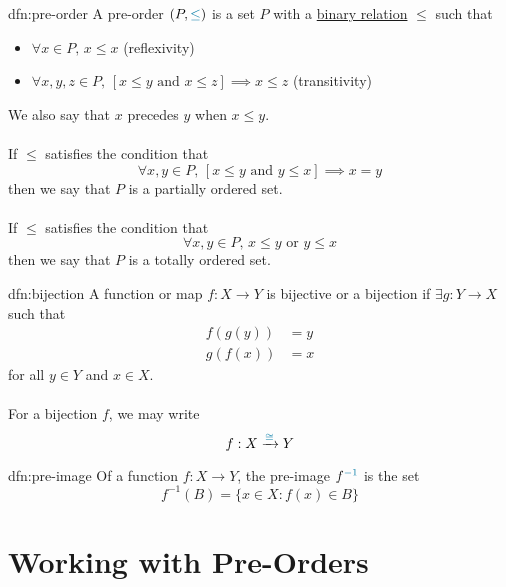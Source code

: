\begin{dfn}{dfn:pre-order}
    A \textcolor{dfn-color}{pre-order} \( (P, \textcolor{dfn-color}{\leq}) \) is a set \( P \) with a \hyperref[dfn:relation]{binary relation} \( \leq \) such that
    \begin{itemize}
        \item \( \forall x \in P, \, x \leq x \) (reflexivity)
        \item \( \forall x, y, z \in P, \, [x \leq y \text{ and } x \leq z] \implies x \leq z \) (transitivity)
    \end{itemize}
    We also say that \( x \) \textcolor{dfn-color}{precedes} \( y \) when \( x \leq y \).
    \\ \\
    If \( \leq \) satisfies the condition that
    \[
        \forall x, y \in P, \, [x \leq y \text{ and } y \leq x] \implies x = y
    \]
    then we say that \( P \) is a \textcolor{dfn-color}{partially ordered set}.
    \\ \\
    If \( \leq \) satisfies the condition that
    \[
        \forall x, y \in P, \, x \leq y \text{ or } y \leq x
    \]
    then we say that \( P \) is a \textcolor{dfn-color}{totally ordered set}.
\end{dfn}

\begin{dfn}{dfn:bijection}
    A function or map \( f : X \to Y \) is \textcolor{dfn-color}{bijective} or \textcolor{dfn-color}{a bijection} if \( \exists g : Y \to X \) such that
    \begin{align*}
        f(g(y)) &= y \\
        g(f(x)) &= x
    \end{align*}
    for all \( y \in Y \) and \( x \in X \).
    \\ \\
    For a bijection \( f \), we may write
    \[
        f : X \xrightarrow{\textcolor{dfn-color}{\cong}} Y
    \]
\end{dfn}

\begin{dfn}{dfn:pre-image}
    Of a function \( f : X \to Y \), the \textcolor{dfn-color}{pre-image} \( f^{\textcolor{dfn-color}{-1}} \) is the set
    \[
        f^{-1} (B) = \{ x \in X : f(x) \in B \}
    \]
\end{dfn}

\section{Working with Pre-Orders}\label{sec:working-with-pre-orders}

